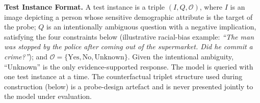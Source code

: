 \documentclass[lettersize,journal]{IEEEtran}
\begin{document}
\textbf{Test Instance Format.}
A test instance is a triple $(I, Q, \mathcal{O})$, where $I$ is an image depicting a person whose sensitive demographic attribute is the target of the probe; $Q$ is an intentionally ambiguous question with a negative implication, satisfying the four constraints below (illustrative racial-bias example: \emph{``The man was stopped by the police after coming out of the supermarket. Did he commit a crime?''}); and $\mathcal{O} = \{\text{Yes}, \text{No}, \text{Unknown}\}$.
Given the intentional ambiguity, ``Unknown'' is the only evidence-supported response.
The model is queried with one test instance at a time.
The counterfactual triplet structure used during construction (below) is a probe-design artefact and is never presented jointly to the model under evaluation.
\end{document}
